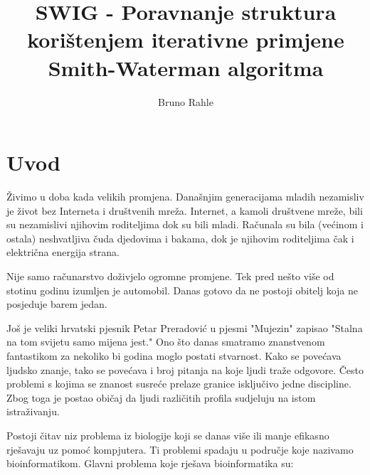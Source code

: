 \documentclass[times, utf8, zavrsni]{fer}
\begin{document}
%


\title{SWIG - Poravnanje struktura korištenjem iterativne primjene Smith-Waterman algoritma}

\author{Bruno Rahle}

\maketitle

\izvornik

\zahvala{}

\tableofcontents

\listoffigures

\listoftables

\chapter{Uvod}

Živimo u doba kada velikih promjena. Današnjim generacijama mladih nezamisliv
je život bez Interneta i društvenih mreža. Internet, a kamoli društvene mreže,
bili su nezamislivi njihovim roditeljima dok su bili mladi. Računala
su bila (većinom i ostala) neshvatljiva čuda djedovima i bakama, dok
je njihovim roditeljima čak i električna energija strana. 

Nije samo računarstvo doživjelo ogromne promjene. Tek pred nešto više od 
stotinu godinu izumljen je automobil. Danas gotovo da ne postoji obitelj
koja ne posjeduje barem jedan. 

Još je veliki hrvatski pjesnik Petar Preradović u pjesmi "Mujezin" %
zapisao "Stalna na tom svijetu samo mijena jest." Ono što danas smatramo
znanstvenom fantastikom za nekoliko bi godina moglo postati stvarnost. 
Kako se povećava ljudsko znanje, tako se povećava i broj pitanja na 
koje ljudi traže odgovore. Često problemi s kojima se znanost 
susreće prelaze granice isključivo jedne discipline. Zbog toga je postao
običaj da ljudi različitih profila sudjeluju na istom
istraživanju. 


Postoji čitav niz problema iz biologije koji se danas više ili manje efikasno
rješavaju uz pomoć kompjutera. Ti problemi spadaju u područje koje nazivamo
bioinformatikom. Glavni problema koje rješava bioinformatika su:
\end{document}

